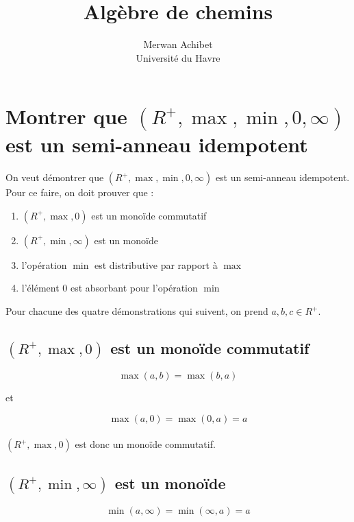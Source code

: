 \documentclass{article}
\title{Algèbre de chemins}
\author{Merwan Achibet\\Université du Havre}
\date{}
\begin{document}
\newcommand{\mmin}{\ensuremath{\operatorname{min}}}
\newcommand{\mmax}{\ensuremath{\operatorname{max}}}
\newcommand{\mMAX}{\ensuremath{\operatorname{MAX}}}
\newcommand{\msi}{\ensuremath{\operatorname{si}}}
\newcommand{\malors}{\ensuremath{\operatorname{alors}}}

\maketitle

\section{Montrer que $(R^+, \mmax, \mmin, 0,
  \infty)$ est un semi-anneau idempotent}

On veut démontrer que $(R^+, \mmax, \mmin, 0, \infty)$ est un
semi-anneau idempotent. Pour ce faire, on doit prouver que :

\begin{enumerate}
  \item{$(R^+, \mmax, 0)$ est un monoïde commutatif}
  \item{$(R^+, \mmin, \infty)$ est un monoïde}
  \item{l'opération $\mmin$ est distributive par rapport à $\mmax$}
  \item{l'élément $0$ est absorbant pour l'opération $\mmin$}
\end{enumerate}

Pour chacune des quatre démonstrations qui suivent, on prend $a, b, c \in R^+$.

\subsection{$(R^+, \mmax, 0)$ est un monoïde commutatif}

$$ \mmax(a, b) = \mmax(b, a)$$
\begin{center}et\end{center}
$$ \mmax(a, 0) = \mmax(0, a) = a $$\\

$(R^+, \mmax, 0)$ est donc un monoïde commutatif.

\subsection{$(R^+, \mmin, \infty)$ est un monoïde}

$$ \mmin(a, \infty) = \mmin(\infty, a) = a$$\\
\end{document}

